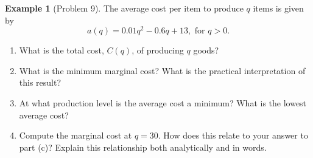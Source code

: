 \documentclass[oneside]{book}
\theoremstyle{definition}
\newtheorem{example}{Example}
\newcommand{\handoutpagebreak}{}
\theoremstyle{solution}
\newcommand{\handoutpagebreak}{\newpage}
\begin{document}
\handoutpagebreak
\begin{example}[Problem 9]
The average cost per item to produce $q$ items is given by
$$ 
a(q) = 0.01q^2 - 0.6q + 13, \text{ for }q > 0.
$$
\begin{enumerate}
\item What is the total cost, $C(q)$, of producing $q$ goods?
\item What is the minimum marginal cost? What is the practical
  interpretation of this result?
\item At what production level is the average cost a minimum? What is
  the lowest average cost?
\item Compute the marginal cost at $q = 30$. How does this relate to
  your answer to part (c)? Explain this relationship both analytically
  and in words.
\end{enumerate}
\end{example}
\end{document}
